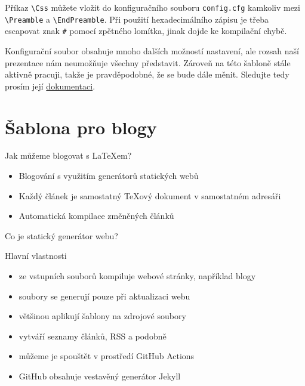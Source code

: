 Příkaz \verb|\Css| můžete vložit do konfiguračního souboru \texttt{config.cfg} 
kamkoliv mezi \verb|\Preamble| a \verb|\EndPreamble|. Při použití hexadecimálního 
zápisu je třeba escapovat znak \verb|#| pomocí zpětného lomítka, jinak dojde ke
kompilační chybě.

Konfigurační soubor obsahuje mnoho dalších možností nastavení, ale rozsah naší prezentace
nám neumožňuje všechny představit. Zároveň na této šabloně stále aktivně pracuji, takže 
je pravděpodobné, že se bude dále měnit. Sledujte tedy prosím její
\href{https://www.kodymirus.cz/tex4ht-booksite/}{dokumentaci}.

\section{Šablona pro blogy}

\begin{frame}[fragile]{Jak můžeme blogovat s \LaTeX em?}


\begin{itemize}
\item Blogování s využitím generátorů statických webů
\item Každý článek je samostatný \TeX ový dokument v samostatném adresáři
\item Automatická kompilace změněných článků
\end{itemize}

\end{frame}


\begin{frame}[fragile]{Co je statický generátor webu?}

  \begin{block}{Hlavní vlastnosti}
  \begin{itemize}
    \item ze vstupních souborů kompiluje webové stránky, například blogy
    \item soubory se generují pouze při aktualizaci webu
    \item většinou aplikují šablony na zdrojové soubory
    \item vytváří seznamy článků, RSS a podobně
    \item můžeme je spouštět v prostředí GitHub Actions
    \item GitHub obsahuje vestavěný generátor Jekyll
  \end{itemize}
\end{block}
\end{frame}

